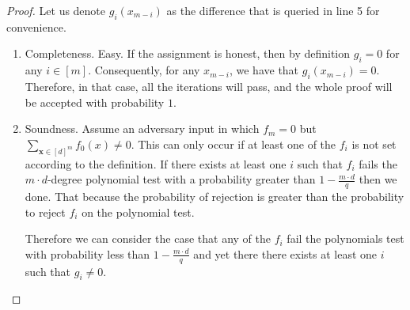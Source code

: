 \documentclass{article}
\begin{document}
\begin{proof} Let us denote $g_{i}\left( x_{m-i} \right)$ as the difference that is queried in line 5 for convenience.
  \begin{enumerate}
    \item Completeness. Easy. %
If the assignment is honest, then by definition $g_i = 0$ for any $i \in [m]$. Consequently, for any $x_{m-i}$, we have that $g_i(x_{m-i}) = 0$. Therefore, in that case, all the iterations will pass, and the whole proof will be accepted with probability $1$.

    \item Soundness. Assume an adversary input in which $f_{m} = 0$ but $\sum_{\mathbf{x} \in [d]^{m}}{f_{0}(x)}\neq 0$. This can only occur if at least one of the $f_{i}$ is not set according to the definition. If there exists at least one $i$ such that $f_{i}$ fails the $m\cdot d$-degree polynomial test with a probability greater than $1 - \frac{m\cdot d}{q}$ then we done. That because the probability of rejection is greater than the probability to reject $f_{i}$ on the polynomial test.

      Therefore we can consider the case that any of the $f_{i}$ fail the polynomials test with probability less than $1 - \frac{m\cdot d}{q}$ and yet there there exists at least one $i$ such that $g_{i}\neq 0$.
      



\end{enumerate}
\end{proof}
\end{document}
